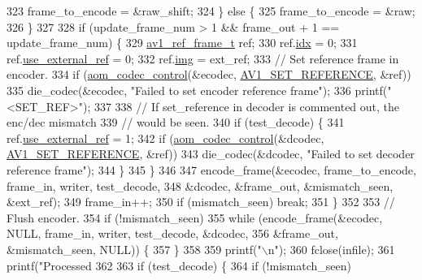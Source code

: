\begin{DoxyCodeInclude}
{{{{{{{{{{323       frame\_to\_encode = &raw\_shift;
324     \} \textcolor{keywordflow}{else} \{
325       frame\_to\_encode = &raw;
326     \}
327 
328     \textcolor{keywordflow}{if} (update\_frame\_num > 1 && frame\_out + 1 == update\_frame\_num) \{
329       \hyperlink{structav1__ref__frame}{av1\_ref\_frame\_t} ref;
330       ref.\hyperlink{structav1__ref__frame_a7c6fcaba58f514985448cb2e2245345c}{idx} = 0;
331       ref.\hyperlink{structav1__ref__frame_a33749c5c20033cc5f7582d0ec1c34ff0}{use\_external\_ref} = 0;
332       ref.\hyperlink{structav1__ref__frame_a55a09db9e1acdd73e656b01fa01283b3}{img} = ext\_ref;
333       \textcolor{comment}{// Set reference frame in encoder.}
334       \textcolor{keywordflow}{if} (\hyperlink{group__codec_ga6da974f4eeaba1fa74106b28d0fe6ac5}{aom\_codec\_control}(&ecodec, \hyperlink{group__aom_gga9421a1fa78c0d9587ae5aa6c1cb3d659a51ad4467b4dc318406cceb257e2daa41}{AV1\_SET\_REFERENCE}, &ref))
335         die\_codec(&ecodec, \textcolor{stringliteral}{"Failed to set encoder reference frame"});
336       printf(\textcolor{stringliteral}{" <SET\_REF>"});
337 
338       \textcolor{comment}{// If set\_reference in decoder is commented out, the enc/dec mismatch}
339       \textcolor{comment}{// would be seen.}
340       \textcolor{keywordflow}{if} (test\_decode) \{
341         ref.\hyperlink{structav1__ref__frame_a33749c5c20033cc5f7582d0ec1c34ff0}{use\_external\_ref} = 1;
342         \textcolor{keywordflow}{if} (\hyperlink{group__codec_ga6da974f4eeaba1fa74106b28d0fe6ac5}{aom\_codec\_control}(&dcodec, \hyperlink{group__aom_gga9421a1fa78c0d9587ae5aa6c1cb3d659a51ad4467b4dc318406cceb257e2daa41}{AV1\_SET\_REFERENCE}, &ref))
343           die\_codec(&dcodec, \textcolor{stringliteral}{"Failed to set decoder reference frame"});
344       \}
345     \}
346 
347     encode\_frame(&ecodec, frame\_to\_encode, frame\_in, writer, test\_decode,
348                  &dcodec, &frame\_out, &mismatch\_seen, &ext\_ref);
349     frame\_in++;
350     \textcolor{keywordflow}{if} (mismatch\_seen) \textcolor{keywordflow}{break};
351   \}
352 
353   \textcolor{comment}{// Flush encoder.}
354   \textcolor{keywordflow}{if} (!mismatch\_seen)
355     \textcolor{keywordflow}{while} (encode\_frame(&ecodec, NULL, frame\_in, writer, test\_decode, &dcodec,
356                         &frame\_out, &mismatch\_seen, NULL)) \{
357     \}
358 
359   printf(\textcolor{stringliteral}{"\(\backslash\)n"});
360   fclose(infile);
361   printf(\textcolor{stringliteral}{"Processed %
362 
363   \textcolor{keywordflow}{if} (test\_decode) \{
364     \textcolor{keywordflow}{if} (!mismatch\_seen)
}}}}}}}}}}}
\end{DoxyCodeInclude}
